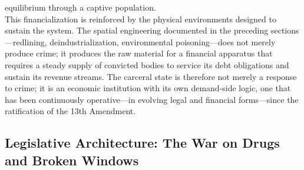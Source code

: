 \documentclass[
]{article}
\begin{document}
equilibrium through a captive population.\\
This financialization is reinforced by the physical environments
designed to sustain the system. The spatial engineering documented in the
preceding sections---redlining, deindustrialization, environmental
poisoning---does not merely produce crime; it produces the raw material
for a financial apparatus that requires a steady supply of convicted
bodies to service its debt obligations and sustain its revenue streams.
The carceral state is therefore not merely a response to crime; it is an
economic institution with its own demand-side logic, one that has been
continuously operative---in evolving legal and financial forms---since
the ratification of the 13th Amendment.

\subsection{\texorpdfstring{\textbf{Legislative Architecture: The War on
Drugs and Broken
Windows}}{Legislative Architecture: The War on Drugs and Broken Windows}}\label{legislative-architecture-the-war-on-drugs-and-broken-windows}
\end{document}
